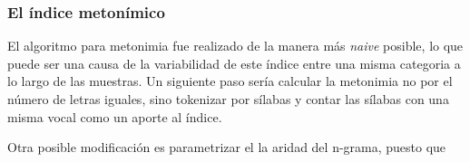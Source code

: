 \documentclass[12pt,letterpaper,twoside]{article}
\begin{document}
\subsubsection{El índice metonímico}
\label{sec:org84e86c1}

El algoritmo para metonimia fue realizado de la manera más \emph{naive} posible, lo que puede ser una causa
de la variabilidad de este índice entre una misma categoria a lo largo de las muestras. Un siguiente
paso sería calcular la metonimia no por el número de letras iguales, sino tokenizar por sílabas y contar
las sílabas con una misma vocal como un aporte al índice.

Otra posible modificación es parametrizar el la aridad del n-grama, puesto que 



 
\nocite{*}
\newpage
\appendix
\end{document}
